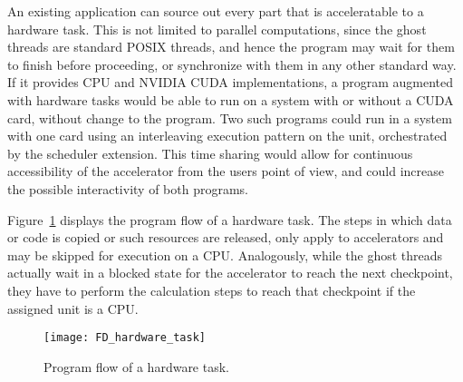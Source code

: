 An existing application can source out every part that is acceleratable to a hardware task. This is not limited to parallel computations, since the ghost threads are standard POSIX threads, and hence the program may wait for them to finish before proceeding, or synchronize with them in any other standard way. If it provides CPU and NVIDIA CUDA implementations, a program augmented with hardware tasks would be able to run on a system with or without a CUDA card, without change to the program. Two such programs could run in a system with one card using an interleaving execution pattern on the unit, orchestrated by the scheduler extension. This time sharing would allow for continuous accessibility of the accelerator from the users point of view, and could increase the possible interactivity of both programs.

Figure~\ref{fig:FlowDiaHWT} displays the program flow of a hardware task. The steps in which data or code is copied or such resources are released, only apply to accelerators and may be skipped for execution on a CPU. Analogously, while the ghost threads actually wait in a blocked state for the accelerator to reach the next checkpoint, they have to perform the calculation steps to reach that checkpoint if the assigned unit is a CPU.
\begin{figure}[htbp]
  \centering
    \texttt{[image: FD\_hardware\_task]}
  \caption[Program flow of a Hardware Task]{Program flow of a hardware task.}
  \label{fig:FlowDiaHWT}
\end{figure}
